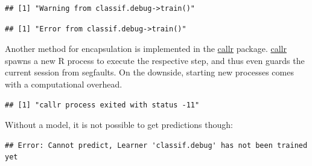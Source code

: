 \documentclass[]{article}
\newenvironment{Shaded}{\begin{snugshade}}{\end{snugshade}}
\newcommand{\DataTypeTok}[1]{\textcolor[rgb]{0.13,0.29,0.53}{#1}}
\newcommand{\DecValTok}[1]{\textcolor[rgb]{0.00,0.00,0.81}{#1}}
\newcommand{\KeywordTok}[1]{\textcolor[rgb]{0.13,0.29,0.53}{\textbf{#1}}}
\newcommand{\NormalTok}[1]{#1}
\newcommand{\OperatorTok}[1]{\textcolor[rgb]{0.81,0.36,0.00}{\textbf{#1}}}
\newcommand{\StringTok}[1]{\textcolor[rgb]{0.31,0.60,0.02}{#1}}
\renewenvironment{Shaded} {\begin{snugshade}\small} {\end{snugshade}}
\begin{document}
\begin{verbatim}
## [1] "Warning from classif.debug->train()"
\end{verbatim}

\begin{Shaded}
\end{Shaded}

\begin{verbatim}
## [1] "Error from classif.debug->train()"
\end{verbatim}

Another method for encapsulation is implemented in the \href{https://cran.r-project.org/package=callr}{callr} package.
\href{https://cran.r-project.org/package=callr}{callr} spawns a new R process to execute the respective step, and thus even guards the current session from segfaults.
On the downside, starting new processes comes with a computational overhead.

\begin{Shaded}
\end{Shaded}

\begin{verbatim}
## [1] "callr process exited with status -11"
\end{verbatim}

Without a model, it is not possible to get predictions though:

\begin{Shaded}
\end{Shaded}

\begin{verbatim}
## Error: Cannot predict, Learner 'classif.debug' has not been trained yet
\end{verbatim}
\end{document}
